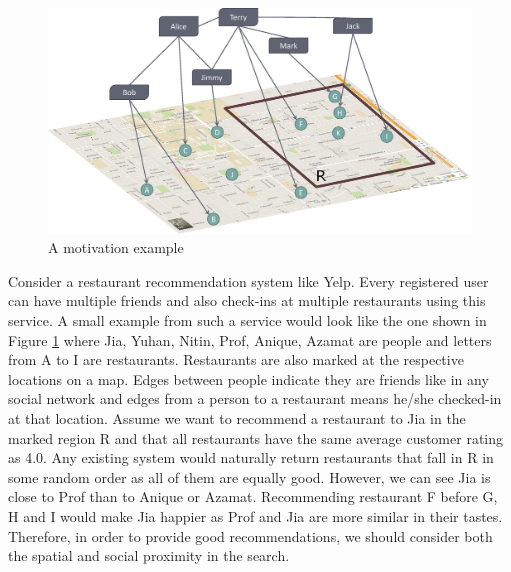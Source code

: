 \begin{figure}[t]
	\centering
	\includegraphics[width=0.88\linewidth]{images/a_motivation_example.eps}
	\caption{A motivation example}
	\label{fig:begin-example}
\end{figure}

Consider a restaurant recommendation system like Yelp. Every registered user can have multiple friends and also check-ins at multiple restaurants using this service. A small example from such a service would look like the one shown in Figure \ref{fig:begin-example} where Jia, Yuhan, Nitin, Prof, Anique, Azamat are people and letters from A to I are restaurants. Restaurants are also marked at the respective locations on a map. Edges between people indicate they are friends like in any social network and edges from a person to a restaurant means he/she checked-in at that location. Assume we want to recommend a restaurant to Jia in the marked region R and that all restaurants have the same average customer rating as 4.0. Any existing system would naturally return restaurants that fall in R in some random order as all of them are equally good. However, we can see Jia is close to Prof than to Anique or Azamat. Recommending restaurant F before G, H and I would make Jia happier as Prof and Jia are more similar in their tastes. Therefore, in order to provide good recommendations, we should consider both the spatial and social proximity in the search.

